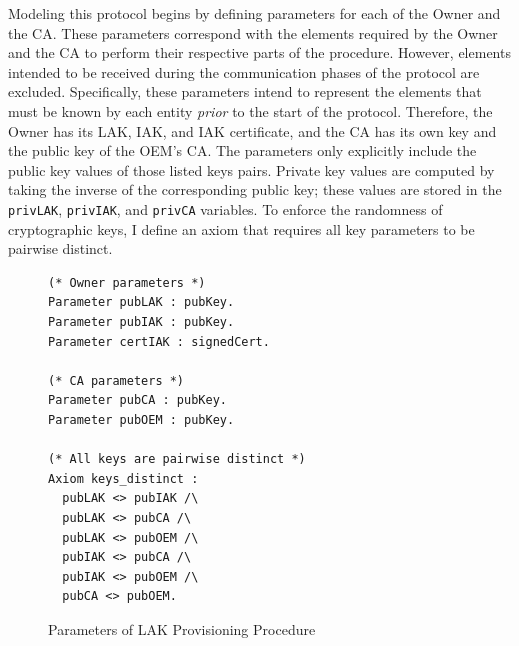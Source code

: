 \documentclass[runningheads]{llncs}
\begin{document}
Modeling this protocol begins by defining parameters for each of the Owner and the CA. These parameters correspond with the elements required by the Owner and the CA to perform their respective parts of the procedure. However, elements intended to be received during the communication phases of the protocol are excluded. Specifically, these parameters intend to represent the elements that must be known by each entity \textit{prior} to the start of the protocol. Therefore, the Owner has its LAK, IAK, and IAK certificate, and the CA has its own key and the public key of the OEM's CA. The parameters only explicitly include the public key values of those listed keys pairs. Private key values are computed by taking the inverse of the corresponding public key; these values are stored in the \verb|privLAK|, \verb|privIAK|, and \verb|privCA| variables. To enforce the randomness of cryptographic keys, I define an axiom that requires all key parameters to be pairwise distinct. 
\begin{figure}[h]
\begin{lstlisting}[language=Coq]
(* Owner parameters *)
Parameter pubLAK : pubKey.
Parameter pubIAK : pubKey.
Parameter certIAK : signedCert.

(* CA parameters *)
Parameter pubCA : pubKey.
Parameter pubOEM : pubKey.

(* All keys are pairwise distinct *)
Axiom keys_distinct :
  pubLAK <> pubIAK /\
  pubLAK <> pubCA /\
  pubLAK <> pubOEM /\
  pubIAK <> pubCA /\
  pubIAK <> pubOEM /\
  pubCA <> pubOEM.
\end{lstlisting}
\caption{Parameters of LAK Provisioning Procedure}
\end{figure}
\end{document}
